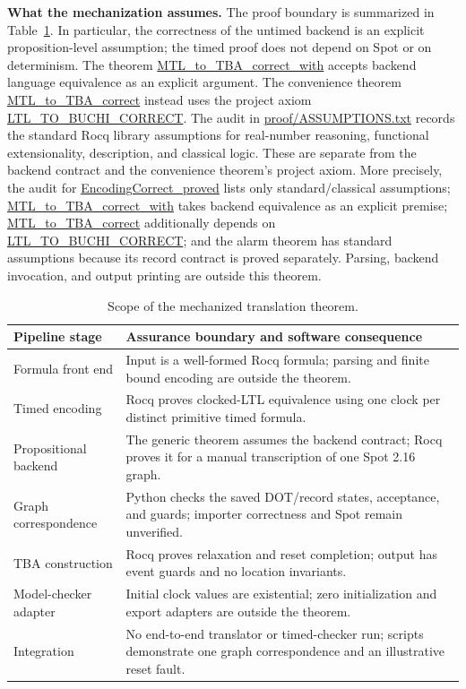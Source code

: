 \documentclass[10pt,journal,compsoc]{IEEEtran}
\newcommand{\runinhead}[1]{\par\smallskip\noindent\textbf{#1}\enspace}
\newcommand{\Rocqid}[1]{{\small\url{#1}}}
\begin{document}
\runinhead{What the mechanization assumes.}
The proof boundary is summarized in Table~\ref{tab:proof-boundary}. In
particular, the correctness of the untimed backend is an explicit
proposition-level assumption; the timed proof does not depend on Spot or on
determinism. The theorem \Rocqid{MTL_to_TBA_correct_with} accepts backend
language equivalence as an explicit argument. The convenience theorem
\Rocqid{MTL_to_TBA_correct} instead uses the project axiom
\Rocqid{LTL_TO_BUCHI_CORRECT}. The audit in
\Rocqid{proof/ASSUMPTIONS.txt} records the standard Rocq library assumptions
for real-number reasoning, functional extensionality, description, and
classical logic. These are separate from the backend contract and the
convenience theorem's project axiom. More precisely, the audit for
\Rocqid{EncodingCorrect_proved} lists only standard/classical assumptions;
\Rocqid{MTL_to_TBA_correct_with} takes backend equivalence as an explicit
premise; \Rocqid{MTL_to_TBA_correct} additionally depends on
\Rocqid{LTL_TO_BUCHI_CORRECT}; and the alarm theorem has standard assumptions
because its record contract is proved separately. Parsing, backend
invocation, and output printing are outside this theorem.
\begin{table}[t]
\centering
\caption{Scope of the mechanized translation theorem.}
\label{tab:proof-boundary}
\footnotesize
\begin{tabular}{@{}p{}p{}@{}}
\toprule
Pipeline stage & Assurance boundary and software consequence\\
\midrule
Formula front end & Input is a well-formed Rocq formula; parsing and finite bound encoding are outside the theorem.\\
Timed encoding & Rocq proves clocked-LTL equivalence using one clock per distinct primitive timed formula.\\
Propositional backend & The generic theorem assumes the backend contract; Rocq proves it for a manual transcription of one Spot 2.16 graph.\\
Graph correspondence & Python checks the saved DOT/record states, acceptance, and guards; importer correctness and Spot remain unverified.\\
TBA construction & Rocq proves relaxation and reset completion; output has event guards and no location invariants.\\
Model-checker adapter & Initial clock values are existential; zero initialization and export adapters are outside the theorem.\\
Integration & No end-to-end translator or timed-checker run; scripts demonstrate one graph correspondence and an illustrative reset fault.\\
\bottomrule
\end{tabular}
\end{table}
\end{document}

